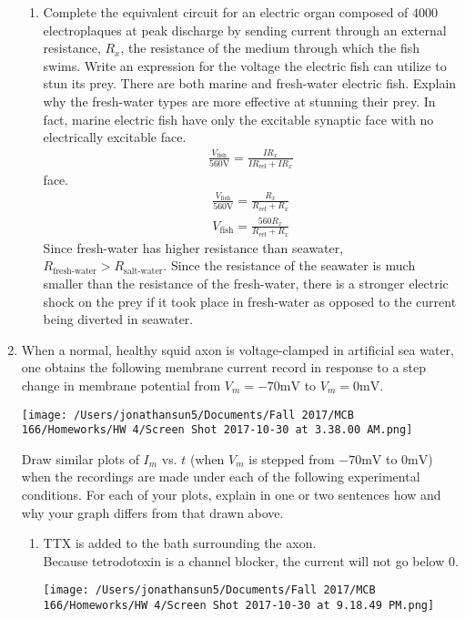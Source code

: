 \documentclass[11pt]{article}
\begin{document}
\begin{enumerate}[label=\arabic*.]
\begin{enumerate}[label=(\alph*)]
\item
Complete the equivalent circuit for an electric organ composed of $4000$ electroplaques at peak discharge by sending current through an external resistance, $R_x$, the resistance of the medium through which the fish swims. Write an expression for the voltage the electric fish can utilize to stun its prey. There are both marine and fresh-water electric fish. Explain why the fresh-water types are more effective at stunning their prey. In fact, marine electric fish have only the excitable synaptic face with no electrically excitable face.
\begin{align*}
\frac{V_{\text{fish}}} {560 \text{V}} = \frac{I R_x} {I R_{\text{eel}} + I R_x}
\end{align*}
face.
\begin{align*}
\frac{V_{\text{fish}}} {560 \text{V}} = \frac{R_x} {R_{\text{eel}} + R_x}
\end{align*}
\begin{align*}
V_{\text{fish}} = \frac{560 R_x} {R_{\text{eel}} + R_x}
\end{align*}
Since fresh-water has higher resistance than seawater, $R_{\text{fresh-water}} > R_{\text{salt-water}}$.  Since the resistance of the seawater is much smaller than the resistance of the fresh-water, there is a stronger electric shock on the prey if it took place in fresh-water as opposed to the current being diverted in seawater.
\end{enumerate}



\newpage
\item
When a normal, healthy squid axon is voltage-clamped in artificial
sea water, one obtains the following membrane current record in response
to a step change in membrane potential from $V_m = -70 \text{mV}$
to $V_m = 0 \text{mV}$.
\begin{center}
\texttt{[image: /Users/jonathansun5/Documents/Fall 2017/MCB 166/Homeworks/HW 4/Screen Shot 2017-10-30 at 3.38.00 AM.png]}
\end{center}
Draw similar plots of $I_m$ vs. $t$ (when $V_m$ is stepped from $- 70 \text{mV}$ to $0 \text{mV}$) when the recordings are made under each of the following experimental conditions. For each of your plots, explain in one or two sentences how and why your graph differs from that drawn above.
\begin{enumerate}[label=(\alph*)]
\item
TTX is added to the bath surrounding the axon.
\vspace*{1\baselineskip}
\\
Because tetrodotoxin is a  channel blocker, the current will not go below 0.
\begin{center}
\texttt{[image: /Users/jonathansun5/Documents/Fall 2017/MCB 166/Homeworks/HW 4/Screen Shot 2017-10-30 at 9.18.49 PM.png]}
\end{center}




\end{enumerate}
\end{enumerate}
\end{document}
